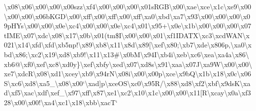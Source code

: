\begin{DoxyCompactItemize}
\textbackslash{}x08\textbackslash{}x06\textbackslash{}x00\textbackslash{}x00\textbackslash{}x00szz\textbackslash{}xf4\textbackslash{}x00\textbackslash{}x00\textbackslash{}x00\textbackslash{}x01s\+R\+G\+B\textbackslash{}x00\textbackslash{}xae\textbackslash{}xce\textbackslash{}x1c\textbackslash{}xe9\textbackslash{}x00\textbackslash{}x00\textbackslash{}x00\textbackslash{}x06b\+K\+G\+D\textbackslash{}x00\textbackslash{}xff\textbackslash{}x00\textbackslash{}xff\textbackslash{}x00\textbackslash{}xff\textbackslash{}xa0\textbackslash{}xbd\textbackslash{}xa7\textbackslash{}x93\textbackslash{}x00\textbackslash{}x00\textbackslash{}x00\textbackslash{}x09p\+H\+Ys\textbackslash{}x00\textbackslash{}x00\textbackslash{}x0e\textbackslash{}xc4\textbackslash{}x00\textbackslash{}x00\textbackslash{}x0e\textbackslash{}xc4\textbackslash{}x01\textbackslash{}x95+\textbackslash{}x0e\textbackslash{}x1b\textbackslash{}x00\textbackslash{}x00\textbackslash{}x00\textbackslash{}x07t\+I\+M\+E\textbackslash{}x07\textbackslash{}xdc\textbackslash{}x08\textbackslash{}x17\textbackslash{}x0b\textbackslash{}x01(tm\$\+I\textbackslash{}x00\textbackslash{}x00\textbackslash{}x01\textbackslash{}xf1\+I\+D\+A\+T\+X\textbackslash{}xc3\textbackslash{}xcd\+W\+A\+N\textbackslash{}x021\textbackslash{}x14\textbackslash{}xfd\textbackslash{}xfd\textbackslash{}xb5np!\textbackslash{}x89\textbackslash{}xb8\textbackslash{}x11\textbackslash{}x8d\textbackslash{}x89\mbox{[}\textbackslash{}xef\textbackslash{}x80;\textbackslash{}xb7\textbackslash{}xde\textbackslash{}x806p,\textbackslash{}xa0\textbackslash{}xbd\textbackslash{}x86;\textbackslash{}xc2\textbackslash{}x19\textbackslash{}xd8\textbackslash{}xb9!\textbackslash{}x11\textbackslash{}x13\#\textbackslash{}x0b\+M\textbackslash{}x94\+I\textbackslash{}xb4i\textbackslash{}xeb\textbackslash{}xc6\textbackslash{}xea\textbackslash{}xa4a\textbackslash{}x86\textbackslash{}xb6@\textbackslash{}xf0\textbackslash{}xef\textbackslash{}xc8\textbackslash{}xd0y\}\textbackslash{}xef\textbackslash{}xbfy\textbackslash{}xed\textbackslash{}x07\textbackslash{}xd8s\textbackslash{}x91\textbackslash{}xaa\textbackslash{}x07\+J\textbackslash{}xa9\+W\textbackslash{}x00\textbackslash{}x00\textbackslash{}xe7\textbackslash{}xdc\+R\textbackslash{}x08\textbackslash{}xd1\textbackslash{}xcey\textbackslash{}xb9\textbackslash{}x94r\+N\textbackslash{}x08i\textbackslash{}x00\textbackslash{}x00p\textbackslash{}xce\textbackslash{}x9b\+Q\textbackslash{}x1b\textbackslash{}x18\textbackslash{}x0c\textbackslash{}x06\+S\textbackslash{}xc6\textbackslash{}xd8\textbackslash{}xa5\+\_\+\textbackslash{}x08\textbackslash{}x00`\textbackslash{}xad\mbox{]}p\textbackslash{}xce\+O\+S\textbackslash{}xc0\textbackslash{}x95\+R/\textbackslash{}x88\textbackslash{}xd8\textbackslash{}xf2\textbackslash{}xbf\textbackslash{}x9ds\+K\textbackslash{}xad\textbackslash{}xf5\textbackslash{}xac\textbackslash{}xdf\textbackslash{}xef\+\_\+\textbackslash{}x97\textbackslash{}xff\textbackslash{}x87\textbackslash{}xe1\textbackslash{}xc2\textbackslash{}x10\textbackslash{}x1c\textbackslash{}x00\textbackslash{}x00\textbackslash{}x11\mbox{[}\+R\textbackslash{}xcay\textbackslash{}x0a\textbackslash{}xf328\textbackslash{}x00\textbackslash{}x00!\textbackslash{}xa4\textbackslash{}xc1\textbackslash{}x18\textbackslash{}xbb\textbackslash{}xac\+T`\textbac
\end{DoxyCompactItemize}
